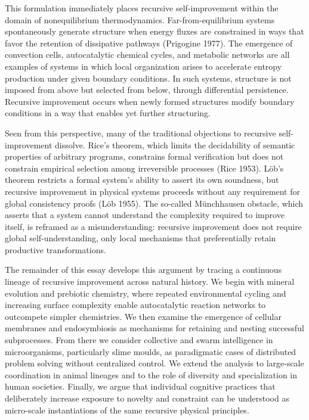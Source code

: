 \documentclass[11pt]{article}
\begin{document}
This formulation immediately places recursive self-improvement within the domain of nonequilibrium thermodynamics. Far-from-equilibrium systems spontaneously generate structure when energy fluxes are constrained in ways that favor the retention of dissipative pathways (Prigogine 1977). The emergence of convection cells, autocatalytic chemical cycles, and metabolic networks are all examples of systems in which local organization arises to accelerate entropy production under given boundary conditions. In such systems, structure is not imposed from above but selected from below, through differential persistence. Recursive improvement occurs when newly formed structures modify boundary conditions in a way that enables yet further structuring.

Seen from this perspective, many of the traditional objections to recursive self-improvement dissolve. Rice’s theorem, which limits the decidability of semantic properties of arbitrary programs, constrains formal verification but does not constrain empirical selection among irreversible processes (Rice 1953). Löb’s theorem restricts a formal system’s ability to assert its own soundness, but recursive improvement in physical systems proceeds without any requirement for global consistency proofs (Löb 1955). The so-called Münchhausen obstacle, which asserts that a system cannot understand the complexity required to improve itself, is reframed as a misunderstanding: recursive improvement does not require global self-understanding, only local mechanisms that preferentially retain productive transformations.

The remainder of this essay develops this argument by tracing a continuous lineage of recursive improvement across natural history. We begin with mineral evolution and prebiotic chemistry, where repeated environmental cycling and increasing surface complexity enable autocatalytic reaction networks to outcompete simpler chemistries. We then examine the emergence of cellular membranes and endosymbiosis as mechanisms for retaining and nesting successful subprocesses. From there we consider collective and swarm intelligence in microorganisms, particularly slime moulds, as paradigmatic cases of distributed problem solving without centralized control. We extend the analysis to large-scale coordination in animal lineages and to the role of diversity and specialization in human societies. Finally, we argue that individual cognitive practices that deliberately increase exposure to novelty and constraint can be understood as micro-scale instantiations of the same recursive physical principles.
\end{document}
